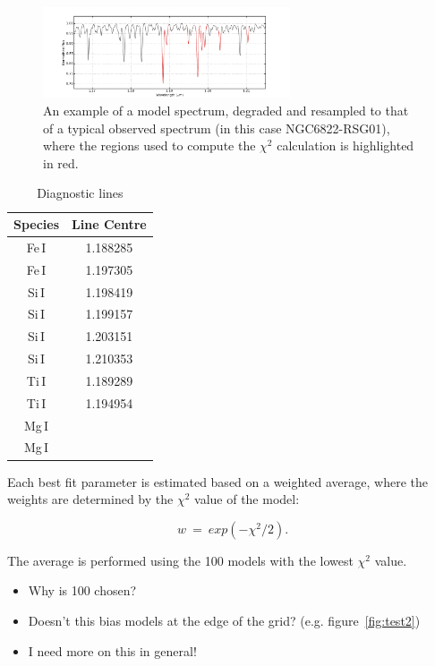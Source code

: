 \begin{figure}
 \centering
 \includegraphics[width=0.65\textwidth]{JAnal/Diag-lines}
 \caption[Diagnostic lines]{
An example of a model spectrum, degraded and resampled to that of a typical observed spectrum (in this case NGC6822-RSG01), where the regions used to compute the $\chi^{2}$ calculation is highlighted in red.\label{fig:lines}
         }
\end{figure}

\begin{table}
\caption[Diagnostic lines]{Diagnostic lines\label{tb:lines}}
\scriptsize
\begin{center}
\begin{tabular}{cc}
 \hline
 \hline
Species & Line Centre \\
 \hline
Fe\,I & 1.188285 \\
Fe\,I & 1.197305 \\
Si\,I & 1.198419 \\
Si\,I & 1.199157 \\
Si\,I & 1.203151 \\
Si\,I & 1.210353 \\
Ti\,I & 1.189289 \\
Ti\,I & 1.194954 \\
Mg\,I & \\
Mg\,I & \\
 \hline
\end{tabular}
\end{center}
\end{table}

Each best fit parameter is estimated based on a weighted average,
where the weights are determined by the $\chi^{2}$ value of the model:

\begin{equation}
    w~=~exp(-\chi^{2}/2).
\end{equation}

The average is performed using the 100 models with the lowest $\chi^{2}$ value.
\begin{itemize}
    \item Why is 100 chosen?
    \item Doesn't this bias models at the edge of the grid? (e.g. figure~\ref{fig:test2})
    \item I need more on this in general!
\end{itemize}

